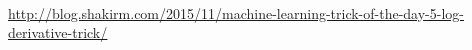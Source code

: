 \begin{flushleft}
{\large {}}\\
\end{flushleft}
\begin{flushleft}\sectionef
[1]\hspace{0.35cm} \href{http://blog.shakirm.com/2015/11/machine-learning-trick-of-the-day-5-log-derivative-trick/}{\underline{http://blog.shakirm.com/2015/11/machine-learning-trick-of-the-day-5-log-derivative-trick/}}
\end{flushleft}

